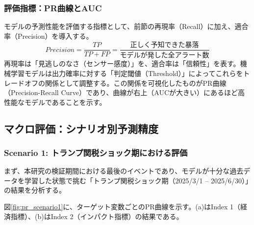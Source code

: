\documentclass[11pt,a4paper,oneside]{ltjsarticle}
\begin{document}
\subsubsection{評価指標：PR曲線とAUC}
モデルの予測性能を評価する指標として、前節の再現率（Recall）に加え、適合率（Precision）を導入する。
\begin{equation}
  Precision = \frac{TP}{TP + FP} = \frac{\text{正しく予知できた暴落}}{\text{モデルが発した全アラート数}}
\end{equation}
再現率は「見逃しのなさ（センサー感度）」を、適合率は「信頼性」を表す。機械学習モデルは出力確率に対する「判定閾値（Threshold）」によってこれらをトレードオフの関係として調整する。この関係を可視化したものがPR曲線（Precision-Recall Curve）であり、曲線が右上（AUCが大きい）にあるほど高性能なモデルであることを示す。

\subsection{マクロ評価：シナリオ別予測精度}

\subsubsection{Scenario 1: トランプ関税ショック期における評価}
まず、本研究の検証期間における最後のイベントであり、モデルが十分な過去データを学習した状態で挑む「トランプ関税ショック期（2025/3/1 -- 2025/6/30）」の結果を分析する。

図\ref{fig:pr_scenario1}に、ターゲット変数ごとのPR曲線を示す。(a)はIndex 1（経済指標）、(b)はIndex 2（インパクト指標）の結果である。
\end{document}
